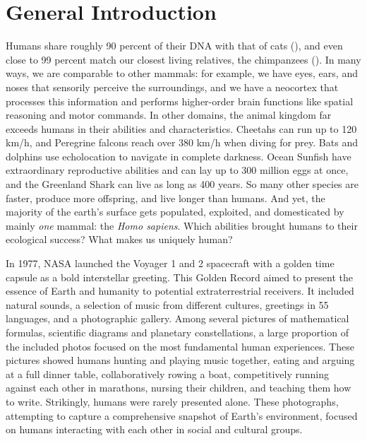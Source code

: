 \documentclass[
]{scrbook}
\begin{document}
\chapter{General Introduction}\label{introduction}

Humans share roughly 90 percent of their DNA with that of cats (), and even close to 99 percent match our closest living relatives, the chimpanzees (). In many ways, we are comparable to other mammals: for example, we have eyes, ears, and noses that sensorily perceive the surroundings, and we have a neocortex that processes this information and performs higher-order brain functions like spatial reasoning and motor commands. In other domains, the animal kingdom far exceeds humans in their abilities and characteristics. Cheetahs can run up to 120 km/h, and Peregrine falcons reach over 380 km/h when diving for prey. Bats and dolphins use echolocation to navigate in complete darkness. Ocean Sunfish have extraordinary reproductive abilities and can lay up to 300 million eggs at once, and the Greenland Shark can live as long as 400 years. So many other species are faster, produce more offspring, and live longer than humans. And yet, the majority of the earth's surface gets populated, exploited, and domesticated by mainly \emph{one} mammal: the \emph{Homo sapiens}. Which abilities brought humans to their ecological success? What makes us uniquely human?

In 1977, NASA launched the Voyager 1 and 2 spacecraft with a golden time capsule as a bold interstellar greeting. This Golden Record aimed to present the essence of Earth and humanity to potential extraterrestrial receivers. It included natural sounds, a selection of music from different cultures, greetings in 55 languages, and a photographic gallery. Among several pictures of mathematical formulas, scientific diagrams and planetary constellations, a large proportion of the included photos focused on the most fundamental human experiences. These pictures showed humans hunting and playing music together, eating and arguing at a full dinner table, collaboratively rowing a boat, competitively running against each other in marathons, nursing their children, and teaching them how to write. Strikingly, humans were rarely presented alone. These photographs, attempting to capture a comprehensive snapshot of Earth's environment, focused on humans interacting with each other in social and cultural groups.
\end{document}
